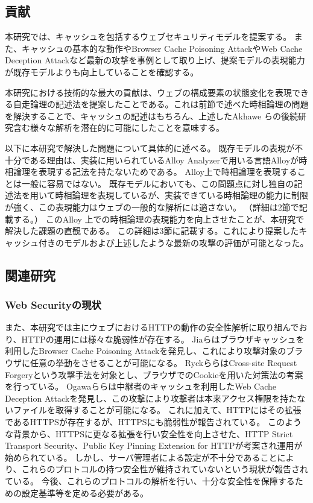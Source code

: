 \documentclass[journal]{IEEEtran}
\begin{document}
\subsection{貢献}
本研究では、キャッシュを包括するウェブセキュリティモデルを提案する。
また、キャッシュの基本的な動作やBrowser Cache Poisoning Attack\cite{bcpattack}やWeb Cache Deception Attack\cite{WCD}など最新の攻撃を事例として取り上げ、提案モデルの表現能力が既存モデルよりも向上していることを確認する。

本研究における技術的な最大の貢献は、ウェブの構成要素の状態変化を表現できる自走論理の記述法を提案したことである。これは前節で述べた時相論理の問題を解決することで、キャッシュの記述はもちろん、上述したAkhawe らの後続研究含む様々な解析を潜在的に可能にしたことを意味する。

以下に本研究で解決した問題について具体的に述べる。
既存モデルの表現が不十分である理由は、実装に用いられているAlloy Analyzerで用いる言語Alloyが時相論理を表現する記法を持たないためである。
Alloy上で時相論理を表現することは一般に容易ではない。
既存モデル\cite{based-model, cookie-model}においても、この問題点に対し独自の記述法を用いて時相論理を表現しているが、実装できている時相論理の能力に制限が強く、この表現能力はウェブの一般的な解析には適さない。
（詳細は2節で記載する。）
このAlloy 上での時相論理の表現能力を向上させたことが、本研究で解決した課題の直観である。
この詳細は3節に記載する。これにより提案したキャッシュ付きのモデルおよび上述したような最新の攻撃の評価が可能となった。


\subsection{関連研究}
\subsubsection{Web Securityの現状}
また、本研究では主にウェブにおけるHTTPの動作の安全性解析に取り組んでおり、HTTPの運用には様々な脆弱性が存在する。
Jiaら\cite{bcpattack}はブラウザキャッシュを利用したBrowser Cache Poisoning Attackを発見し、これにより攻撃対象のブラウザに任意の挙動をさせることが可能になる。
Ryckら\cite{cookie-model}らはCross-site Request Forgeryという攻撃手法を対象とし、ブラウザでのCookieを用いた対策法の考案を行っている。
Ogawaら\cite{WCD}らは中継者のキャッシュを利用したWeb Cache Deception Attackを発見し、この攻撃により攻撃者は本来アクセス権限を持たないファイルを取得することが可能になる。
これに加えて、HTTPにはその拡張であるHTTPSが存在するが、HTTPSにも脆弱性が報告されている\cite{poodle}。
このような背景から、HTTPSに更なる拡張を行い安全性を向上させた、HTTP Strict Transport Security\cite{hsts}、Public Key Pinning Extension for HTTP\cite{hpkp}が考案され運用が始められている。
しかし、サーバ管理者による設定が不十分であることにより、これらのプロトコルの持つ安全性が維持されていないという現状が報告されている\cite{hstshpkp}。
今後、これらのプロトコルの解析を行い、十分な安全性を保障するための設定基準等を定める必要がある。
\end{document}
